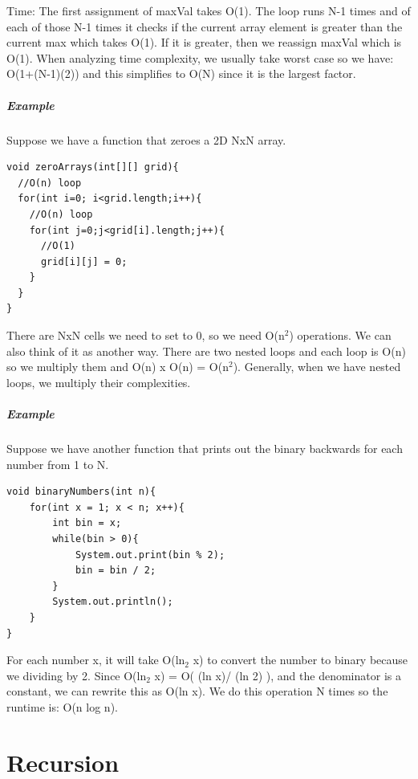 \documentclass[11pt,oneside]{book}
\begin{document}
Time: The first assignment of maxVal takes O(1). The loop runs N-1 times and of each of those N-1 times it checks if the current array element is greater than the current max which takes O(1). If it is greater, then we reassign maxVal which is O(1). When analyzing time complexity, we usually take worst case so we have: O(1+(N-1)(2)) and this simplifies to O(N) since it is the largest factor.

\subsubsection{Example}

Suppose we have a function that zeroes a 2D NxN array.

\begin{lstlisting}
void zeroArrays(int[][] grid){
  //O(n) loop
  for(int i=0; i<grid.length;i++){
    //O(n) loop
    for(int j=0;j<grid[i].length;j++){
      //O(1)
      grid[i][j] = 0;
    }
  }
}
\end{lstlisting}

There are NxN cells we need to set to 0, so we need O(n$^{2}$) operations. We can also think of it as another way. There are two nested loops and each loop is O(n) so we multiply them and O(n) x O(n) = O(n$^{2}$). Generally, when we have nested loops, we multiply their complexities.

\subsubsection{Example}

Suppose we have another function that prints out the binary backwards for each number from 1 to N.

\begin{lstlisting}
void binaryNumbers(int n){
    for(int x = 1; x < n; x++){
        int bin = x;
        while(bin > 0){
            System.out.print(bin % 2);
            bin = bin / 2;
        }
        System.out.println();
    }
}
\end{lstlisting}

For each number x, it will take O(ln$_{2}$ x) to convert the number to binary because we dividing by 2. Since O(ln$_{2}$ x) = O( (ln x)/ (ln 2) ), and the denominator is a constant, we can rewrite this as O(ln x). We do this operation N times so the runtime is: O(n log n).

\part{ Recursion }
\end{document}
